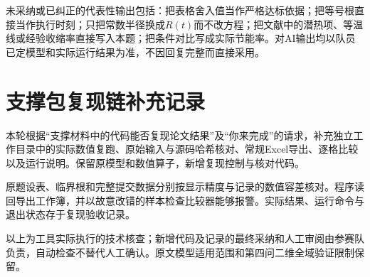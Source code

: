 \documentclass[UTF8,a4paper,zihao=5,fontset=windows]{ctexart}
\begin{document}
\vspace{0.6em}
未采纳或已纠正的代表性输出包括：把表格舍入值当作严格达标依据；把等号根直接当作执行时刻；只把常数半径换成$R(t)$而不改方程；把文献中的潜热项、等温线或经验收缩率直接写入本题；把条件对比写成实际节能率。对AI输出均以队员已定模型和实际运行结果为准，不因回复完整而直接采用。


\section{支撑包复现链补充记录}
本轮根据“支撑材料中的代码能否复现论文结果”及“你来完成”的请求，补充独立工作目录中的实际数值复跑、原始输入与源码哈希核对、常规Excel导出、逐格比较以及运行说明。保留原模型和数值算子，新增复现控制与核对代码。

原题设表、临界根和完整提交数据分别按显示精度与记录的数值容差核对。程序读回导出工作簿，并以故意改错的样本检查比较器能够报警。实际结果、运行命令与退出状态存于复现验收记录。

以上为工具实际执行的技术核查；新增代码及记录的最终采纳和人工审阅由参赛队负责，自动检查不替代人工确认。原文模型适用范围和第四问二维全域验证限制保留。
\end{document}

